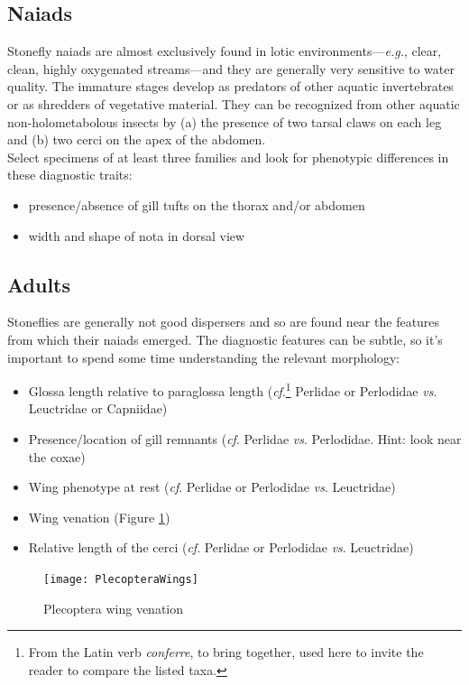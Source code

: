 \documentclass[letterpaper, 11pt]{article}
\begin{document}
\subsection*{Naiads}
Stonefly naiads are almost exclusively found in lotic environments---\textit{e.g.}, clear, clean, highly oxygenated streams---and they are generally very sensitive to water quality. The immature stages develop as predators of other aquatic invertebrates or as shredders of vegetative material. They can be recognized from other aquatic non-holometabolous insects by (a) the presence of two tarsal claws on each leg and (b) two cerci on the apex of the abdomen.\\

\noindent{}Select specimens of at least three families and look for phenotypic differences in these diagnostic traits:
\begin{itemize}
\item presence/absence of gill tufts on the thorax and/or abdomen
\item width and shape of nota in dorsal view
\end{itemize}

\subsection*{Adults}
Stoneflies are generally not good dispersers and so are found near the features from which their naiads emerged. The diagnostic features can be subtle, so it's important to spend some time understanding the relevant morphology:

\begin{itemize}
\item Glossa length relative to paraglossa length (\textit{cf}.\footnote{From the Latin verb \textit{conferre}, to bring together, used here to invite the reader to compare the listed taxa.} Perlidae or Perlodidae \textit{vs}. Leuctridae or Capniidae)
\item Presence/location of gill remnants (\textit{cf}. Perlidae \textit{vs}. Perlodidae. Hint: look near the coxae)
\item Wing phenotype at rest (\textit{cf}. Perlidae or Perlodidae \textit{vs}. Leuctridae)
\item Wing venation (Figure \ref{fig:plecowings})
\item Relative length of the cerci (\textit{cf}. Perlidae or Perlodidae \textit{vs}. Leuctridae)
\end{itemize}

\begin{figure}[ht!]
  \centering
    \texttt{[image: PlecopteraWings]}
  \caption{Plecoptera wing venation \citep[modified from][Fig. 1]{bhl29875}}
  \label{fig:plecowings}
\end{figure}
\end{document}

